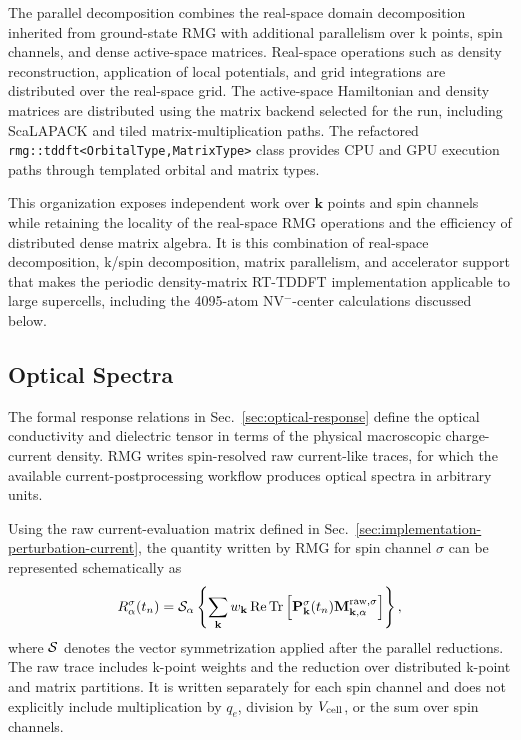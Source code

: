 The parallel decomposition combines the real-space domain
decomposition inherited from ground-state RMG with additional
parallelism over k points, spin channels, and dense active-space
matrices.  Real-space operations such as density reconstruction,
application of local potentials, and grid integrations are distributed
over the real-space grid.  The active-space Hamiltonian and density
matrices are distributed using the matrix backend selected for the
run, including ScaLAPACK and tiled matrix-multiplication paths.  The
refactored \texttt{rmg::tddft<OrbitalType,MatrixType>} class provides
CPU and GPU execution paths through templated orbital and matrix
types.

This organization exposes independent work over $\mathbf k$ points and
spin channels while retaining the locality of the real-space RMG
operations and the efficiency of distributed dense matrix algebra.  It
is this combination of real-space decomposition, k/spin decomposition,
matrix parallelism, and accelerator support that makes the periodic
density-matrix RT-TDDFT implementation applicable to large supercells,
including the 4095-atom NV$^{-}$-center calculations discussed below.

\subsection{Optical Spectra}%
\label{sec:implementation-optical-processing}

The formal response relations in Sec.~\ref{sec:optical-response}
define the optical conductivity and dielectric tensor in terms of the
physical macroscopic charge-current density.  RMG writes
spin-resolved raw current-like traces, for which the available
current-postprocessing workflow produces optical spectra in arbitrary
units.

Using the raw current-evaluation matrix defined in
Sec.~\ref{sec:implementation-perturbation-current}, the quantity
written by RMG for spin channel $\sigma$ can be represented
schematically as
\begin{equation}
  R_\alpha^\sigma(t_n)
  =
  {\cal S}_\alpha
  \left\{
  \sum_{\mathbf k}
  w_{\mathbf k}\,
  {\rm Re}\,
  {\rm Tr}
  \left[
    \mathbf P_{\mathbf k}^{\sigma}(t_n)
    \mathbf M_{\mathbf k,\alpha}^{\rm raw,\sigma}
  \right]
  \right\},
  \label{eq:impl_raw_current_trace}
\end{equation}
where ${\cal S}$ denotes the vector symmetrization applied after the
parallel reductions.  The raw trace includes k-point weights and the
reduction over distributed k-point and matrix partitions.  It is
written separately for each spin channel and does not explicitly
include multiplication by $q_e$, division by $V_{\rm cell}$, or the
sum over spin channels.

